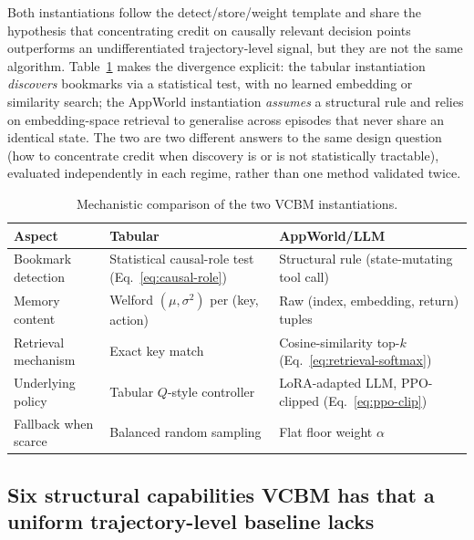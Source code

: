\documentclass[conference]{IEEEtran}
\begin{document}
Both instantiations follow the detect/store/weight template and share the hypothesis that concentrating credit on causally relevant decision points outperforms an undifferentiated trajectory-level signal, but they are not the same algorithm. Table~\ref{tab:vcbm-comparison} makes the divergence explicit: the tabular instantiation \emph{discovers} bookmarks via a statistical test, with no learned embedding or similarity search; the AppWorld instantiation \emph{assumes} a structural rule and relies on embedding-space retrieval to generalise across episodes that never share an identical state. The two are two different answers to the same design question (how to concentrate credit when discovery is or is not statistically tractable), evaluated independently in each regime, rather than one method validated twice.

\begin{table}[htbp]
  \centering
  \caption{Mechanistic comparison of the two VCBM instantiations.}
  \label{tab:vcbm-comparison}
  \begin{tabular}{@{}p{1.7cm}p{2.9cm}p{2.9cm}@{}}
    \toprule
    \textbf{Aspect} & \textbf{Tabular} & \textbf{AppWorld/LLM} \\
    \midrule
    Bookmark detection & Statistical causal-role test (Eq.~\eqref{eq:causal-role}) & Structural rule (state-mutating tool call) \\
    Memory content & Welford $(\mu, \sigma^2)$ per (key, action) & Raw (index, embedding, return) tuples \\
    Retrieval mechanism & Exact key match & Cosine-similarity top-$k$ (Eq.~\eqref{eq:retrieval-softmax}) \\
    Underlying policy & Tabular $Q$-style controller & LoRA-adapted LLM, PPO-clipped (Eq.~\eqref{eq:ppo-clip}) \\
    Fallback when scarce & Balanced random sampling & Flat floor weight $\alpha$ \\
    \bottomrule
  \end{tabular}
\end{table}

\subsection{Six structural capabilities VCBM has that a uniform trajectory-level baseline lacks}
\label{sec:vcbm-capabilities}
\end{document}
